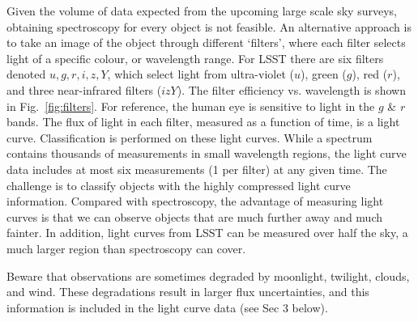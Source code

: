 Given the volume of data expected from the upcoming large scale sky surveys, obtaining spectroscopy for every object is not feasible. An alternative approach is to take an image of the object through different `filters', where each filter selects light of a specific colour, or wavelength range. 
For LSST there are six filters denoted $u,g,r,i,z,Y$, which select light from 
ultra-violet ($u$), green ($g$), red ($r$), and three near-infrared filters ($izY$).
The filter efficiency vs. wavelength is shown in Fig.~\ref{fig:filters}.
For reference, the human eye is sensitive to light in the $g$ \& $r$ bands.
The flux of light in each filter, measured as a function of time, is a light curve.
Classification is performed on these light curves. 
While a spectrum contains thousands of measurements in small wavelength regions, 
the light curve data includes at most six measurements (1 per filter) at any given time. 
The challenge is to classify objects with the highly compressed light curve information. 
Compared with spectroscopy, the advantage of measuring light curves is that 
we can observe objects that are much further away and much fainter. In addition,
light curves from LSST can be measured over half the sky, a much larger region
than spectroscopy can cover.



Beware that observations are sometimes degraded by moonlight, twilight, clouds, and wind.
These degradations result in larger flux uncertainties, 
and this information is included in the light curve data (see Sec 3 below).

